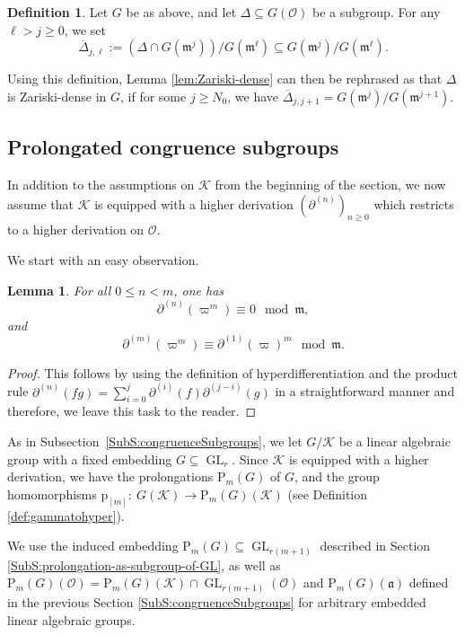 \documentclass[10pt,a4paper]{amsart}
\theoremstyle{plain} %
\newtheorem{Lemma}[Theorem]{Lemma}
\theoremstyle{definition}
\newtheorem{Definition}[Theorem]{Definition}
\theoremstyle{remark}
\newcommand{\cK}{\mathcal{K}}   %
\newcommand{\cO}{\mathcal{O}}   %
\newcommand{\fa}{\mathfrak{a}}  %
\newcommand{\fm}{\mathfrak{m}}  %
\newcommand{\rP}[1]{\mathrm{P}_{\!#1}}
\newcommand{\GL}{\operatorname{GL}}
\newcommand{\hd}[2]{\partial^{(#1)}\!\!\left(#2\right)} %
\newcommand{\hde}[1]{\partial^{(#1)}}  %
\newcommand{\prol}[1]{\mathrm{p}_{[#1]}}
\numberwithin{equation}{subsection}
\begin{document}
\begin{Definition}\label{def:Delta-bar}
Let $G$  be as above, and let $\Delta\subseteq G(\cO)$ be a subgroup.
For any $\ell>j\geq 0$, we set
\[ \overline{\Delta}_{j,\ell}:= \left(\Delta\cap G(\fm^j)\right)/G(\fm^\ell) \subseteq G(\fm^j)/G(\fm^\ell). \]
\end{Definition}

Using this definition, Lemma \ref{lem:Zariski-dense} can then be rephrased as that $\Delta$ is Zariski-dense in $G$, if for some
$j\geq N_0$, we have $\overline{\Delta}_{j,j+1}= G(\fm^j)/G(\fm^{j+1})$.

\subsection{Prolongated congruence subgroups}\label{SubS:procongsub}

In addition to the assumptions on $\cK$ from the beginning of the section, we now assume that $\cK$ is equipped with a higher derivation $(\hde{n})_{n\geq 0}$ which restricts to a higher derivation on $\cO$. 

We start with an easy observation.

\begin{Lemma}\label{lem:congruence-mod-fm}
For all $0\leq n< m$, one has
\[ \hd{n}{\varpi^m} \equiv 0 \mod \fm, \]
and
\[ \hd{m}{\varpi^m} \equiv \hd{1}{\varpi}^m \mod \fm. \] 
\end{Lemma}	
\begin{proof}
This follows by using the definition of hyperdifferentiation  and the product rule $\hd{n}{fg} = \sum_{i=0}^j \hd{i}{f}\hd{j-i}{g}$ in a straightforward manner and therefore, we leave this task to the reader.
\end{proof}

As in Subsection~\ref{SubS:congruenceSubgroups}, we let $G/\cK$ be a linear algebraic group with a fixed embedding $G\subseteq \GL_r$. Since $\cK$ is equipped with a higher derivation, we have the prolongations $\rP{m}(G)$ of $G$, and the group homomorphisms $\prol{m}:~G(\cK)\to \rP{m}(G)(\cK)$ (see Definition \ref{def:gammatohyper}). 

We use the induced embedding $\rP{m}(G)\subseteq \GL_{r(m+1)}$ described in Section \ref{SubS:prolongation-as-subgroup-of-GL}, as well as
$\rP{m}(G)(\cO)=\rP{m}(G)(\cK)\cap \GL_{r(m+1)}(\cO)$ 
and $\rP{m}(G)(\fa)$ defined in the previous Section \ref{SubS:congruenceSubgroups} for arbitrary embedded linear algebraic groups.
\end{document}
